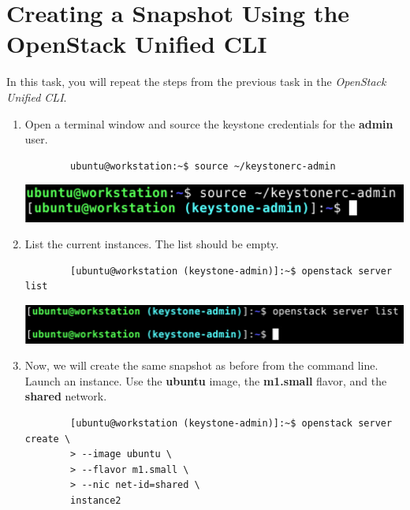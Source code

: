 \documentclass[letterpaper, 12pt]{article}
\begin{document}
\section{Creating a Snapshot Using the OpenStack Unified CLI}
\label{sec:creating_a_snapshot_cli}
In this task, you will repeat the steps from the previous task in the \textit{OpenStack Unified CLI}.

\begin{enumerate}
    \item Open a terminal window and source the keystone credentials for the \textbf{admin} user.
    \begin{lstlisting}
        ubuntu@workstation:~$ source ~/keystonerc-admin
    \end{lstlisting}

    \begin{center}
        \includegraphics[width=\linewidth]{images/part2/step1.png}
    \end{center}

    \item List the current instances.
    The list should be empty.
    \begin{lstlisting}
        [ubuntu@workstation (keystone-admin)]:~$ openstack server list
    \end{lstlisting}

    \begin{center}
        \includegraphics[width=\linewidth]{images/part2/step2.png}
    \end{center}

    \item Now, we will create the same snapshot as before from the command line.
    Launch an instance.
    Use the \textbf{ubuntu} image, the \textbf{m1.small} flavor, and the \textbf{shared} network.
    \begin{lstlisting}
        [ubuntu@workstation (keystone-admin)]:~$ openstack server create \
        > --image ubuntu \
        > --flavor m1.small \
        > --nic net-id=shared \
        instance2
    \end{lstlisting}


\end{enumerate}
\end{document}
